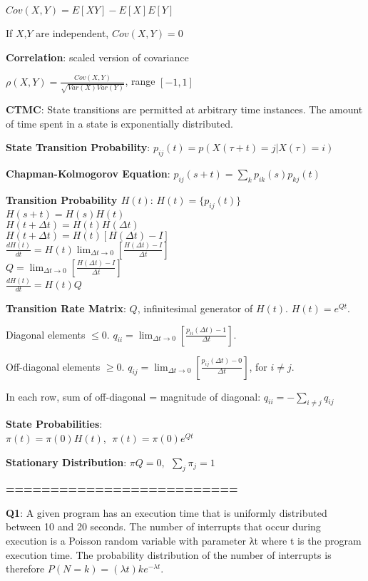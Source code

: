 \documentclass{scrartcl}
\begin{document}
\begin{multicols*}{3}
$Cov(X,Y) = E[XY] - E[X]E[Y]$

If $X$,$Y$ are independent, $Cov(X,Y)=0$



{\bf Correlation}: scaled version of covariance

$\rho(X,Y)=\frac{Cov(X,Y)}{\sqrt{Var(X)Var(Y)}}$, range $[-1,1]$



{\bf CTMC}: State transitions are permitted at arbitrary time instances. The amount of time spent in a state is exponentially distributed.

{\bf State Transition Probability}: $p_{ij}(t) = p(X(\tau+t)=j|X(\tau)=i)$

{\bf Chapman-Kolmogorov Equation}: $p_{ij}(s+t) = \sum_kp_{ik}(s)p_{kj}(t)$

{\bf Transition Probability $H(t)$}:
$H(t) = \{p_{ij}(t)\}$ \\
$H(s+t) = H(s)H(t)$ \\
$H(t+\Delta t) = H(t)H(\Delta t)$ \\
$H(t+\Delta t) = H(t)[H(\Delta t)-I]$ \\
$\frac{dH(t)}{dt} = H(t)\lim_{\Delta t\to 0}[\frac{H(\Delta t) - I}{\Delta t}]$ \\
$Q = \lim_{\Delta t\to 0}[\frac{H(\Delta t)-I}{\Delta t}]$ \\
$\frac{dH(t)}{dt} = H(t)Q$

{\bf Transition Rate Matrix}: $Q$, infinitesimal generator of $H(t)$. $H(t)=e^{Qt}$.

Diagonal elements $\leq 0$. $q_{ii}=\lim_{\Delta t\to 0}[\frac{p_{ii}(\Delta t)-1}{\Delta t}]$.

Off-diagonal elements $\geq 0$. $q_{ij}=\lim_{\Delta t\to 0}[\frac{p_{ij}(\Delta t)-0}{\Delta t}]$, for $i\neq j$.

In each row, sum of off-diagonal = magnitude of diagonal: $q_{ii}=-\sum_{i\neq j}q_{ij}$

{\bf State Probabilities}:\\ $\pi(t)=\pi(0)H(t)$, $\;\pi(t)=\pi(0)e^{Qt}$

{\bf Stationary Distribution}: $\pi Q=0$, $\;\sum_j\pi_j=1$



{\bf ==========================}



{\bf Q1}: A given program has an execution time that is uniformly distributed between 10 and 20 seconds. The number of interrupts that occur during execution is a Poisson random variable with parameter λt where t is the program execution time. The probability distribution of the number of interrupts is therefore $P(N = k) = (\lambda t)ke^{−\lambda t}$.


\end{multicols*}
\end{document}
